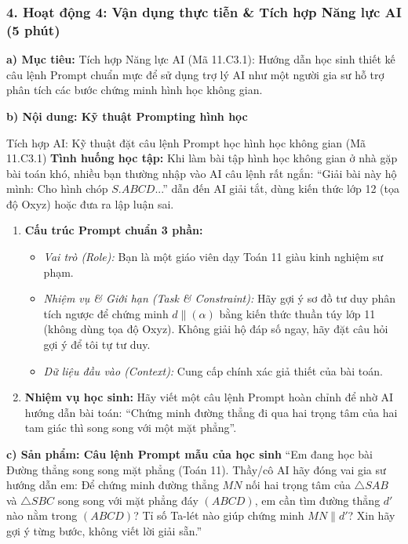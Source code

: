 \documentclass[12pt, a4paper]{article}
\begin{document}
\subsubsection*{4. Hoạt động 4: Vận dụng thực tiễn & Tích hợp Năng lực AI (5 phút)}

\noindent \textbf{a) Mục tiêu:}
Tích hợp Năng lực AI (Mã 11.C3.1): Hướng dẫn học sinh thiết kế câu lệnh Prompt chuẩn mực để sử dụng trợ lý AI như một người gia sư hỗ trợ phân tích các bước chứng minh hình học không gian.

\noindent \textbf{b) Nội dung: Kỹ thuật Prompting hình học}
\begin{aibox}{Tích hợp AI: Kỹ thuật đặt câu lệnh Prompt học hình học không gian (Mã 11.C3.1)}
\textbf{Tình huống học tập:}
Khi làm bài tập hình học không gian ở nhà gặp bài toán khó, nhiều bạn thường nhập vào AI câu lệnh rất ngắn: ``Giải bài này hộ mình: Cho hình chóp $S.ABCD$...'' dẫn đến AI giải tắt, dùng kiến thức lớp 12 (tọa độ Oxyz) hoặc đưa ra lập luận sai.
\begin{enumerate}[leftmargin=0.6cm]
    \item \textbf{Cấu trúc Prompt chuẩn 3 phần:}
    \begin{itemize}
        \item \textit{Vai trò (Role):} Bạn là một giáo viên dạy Toán 11 giàu kinh nghiệm sư phạm.
        \item \textit{Nhiệm vụ \& Giới hạn (Task \& Constraint):} Hãy gợi ý sơ đồ tư duy phân tích ngược để chứng minh $d \parallel (\alpha)$ bằng kiến thức thuần túy lớp 11 (không dùng tọa độ Oxyz). Không giải hộ đáp số ngay, hãy đặt câu hỏi gợi ý để tôi tự tư duy.
        \item \textit{Dữ liệu đầu vào (Context):} Cung cấp chính xác giả thiết của bài toán.
    \end{itemize}
    \item \textbf{Nhiệm vụ học sinh:} Hãy viết một câu lệnh Prompt hoàn chỉnh để nhờ AI hướng dẫn bài toán: ``Chứng minh đường thẳng đi qua hai trọng tâm của hai tam giác thì song song với một mặt phẳng''.
\end{enumerate}
\end{aibox}

\noindent \textbf{c) Sản phẩm: Câu lệnh Prompt mẫu của học sinh}
``Em đang học bài Đường thẳng song song mặt phẳng (Toán 11). Thầy/cô AI hãy đóng vai gia sư hướng dẫn em: Để chứng minh đường thẳng $MN$ nối hai trọng tâm của $\triangle SAB$ và $\triangle SBC$ song song với mặt phẳng đáy $(ABCD)$, em cần tìm đường thẳng $d'$ nào nằm trong $(ABCD)$? Tỉ số Ta-lét nào giúp chứng minh $MN \parallel d'$? Xin hãy gợi ý từng bước, không viết lời giải sẵn.''
\end{document}
